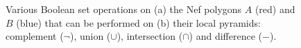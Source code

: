 \begin{figure}[tb]
\centering
{}
\quad
{}
\caption[Boolean set operations on Nef polygons]{Various Boolean set operations on (a) the Nef polygons $A$ (red) and $B$ (blue) that can be performed on (b) their local pyramids: complement ($\neg$), union ($\cup$), intersection ($\cap$) and difference ($-$).}
\label{fig:nef-boolean}
\end{figure}

